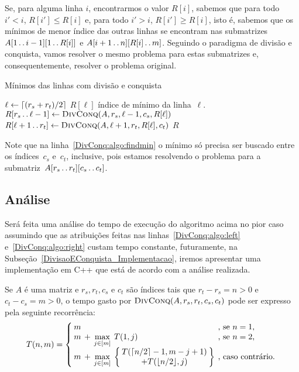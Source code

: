 Se, para alguma linha $i$, encontrarmos o valor $R[i]$, sabemos que para todo $i' < i$, $R[i'] \leq R[i]$ e, para todo $i' > i$, $R[i'] \geq R[i]$, isto é, sabemos que os mínimos de menor índice das outras linhas se encontram nas submatrizes $A[1 \,.\,.\, i-1][1 \,.\,.\, R[i]]$ e $A[i+1 \,.\,.\, n][R[i] \,.\,.\, m]$. Seguindo o paradigma de divisão e conquista, vamos resolver o mesmo problema para estas submatrizes e, consequentemente, resolver o problema original. 

\newcommand{\FRMDC}{\textsc{DivConq}}
\begin{algorithm}[H]
\caption{Mínimos das linhas com divisão e conquista}
\label{DivConq:algo}
\begin{algorithmic}[1]
\Function{\FRMDC}{A, r_s, r_t, c_s, c_t}
    \State $\ell \leftarrow \lceil(r_s+r_t)/2\rceil$
    \State $R[\ell]$ índice de mínimo da linha~$\ell$. \label{DivConq:algo:findmin}
        \State $R[r_s \tdots \ell-1] \rec \FRMDC(A, r_s, \ell-1, c_s, R[\ell])$ \label{DivConq:algo:left}
    \EndIf
        \State $R[\ell+1 \tdots r_t] \rec \FRMDC(A, \ell+1, r_t, R[\ell], c_t)$ \label{DivConq:algo:right}
    \EndIf
    \State \Return $R$
\EndFunction
\end{algorithmic}
\end{algorithm}

Note que na linha~\ref{DivConq:algo:findmin} o mínimo só precisa ser buscado entre os índices~$c_s$ e~$c_t$, inclusive, pois estamos resolvendo o problema para a submatriz~$A[r_s \,.\,.\, r_t][c_s \,.\,.\, c_t]$.

\subsection{Análise}
Será feita uma análise do tempo de execução do algoritmo acima no pior caso assumindo que as atribuições feitas nas linhas~\ref{DivConq:algo:left} e~\ref{DivConq:algo:right} custam tempo constante, futuramente, na Subseção~\ref{DivisaoEConquista_Implementacao}, iremos apresentar uma implementação em C++ que está de acordo com a análise realizada.  

Se $A$ é uma matriz e $r_s,r_t,c_s$ e $c_t$ são índices tais que $r_t-r_s = n > 0$ e $c_t-c_s = m > 0$, o tempo gasto por $\FRMDC(A,r_s,r_t,c_s,c_t)$ pode ser expresso pela seguinte recorrência:
\begin{equation*}
\arraycolsep=2pt
T(n,m) = \left\{
\begin{array}{lllll}
    m &   &                         &                         & \text{, se } n = 1 \text{,} \\
    m & + & \max\limits_{j \in [m]} & T(1,j)                  & \text{, se } n = 2 \text{,} \\[2pt]
    m & + & \max\limits_{j \in [m]} & \left\{\begin{array}{c}
     T(\ceil{n/2}-1,m-j+1) \\
     + T(\floor{n/2},j)    \\
    \end{array} \right\}                                      & \text{, caso contrário.} \\
\end{array}
\right.
\end{equation*}

